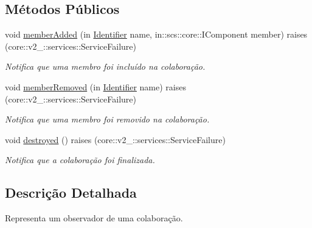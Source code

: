 \subsection*{\-Métodos \-Públicos}
\begin{DoxyCompactItemize}
\item 
void \hyperlink{interfacetecgraf_1_1openbus_1_1services_1_1collaboration_1_1v1__0_1_1CollaborationObserver_a43a313920a1c86e2398bc5bd3c1b1271}{member\-Added} (in \hyperlink{namespacetecgraf_1_1openbus_1_1services_1_1collaboration_1_1v1__0_a75ab61291da492f86a7ea465804c7e45}{\-Identifier} name, in\-::scs\-::core\-::\-I\-Component member)  raises (core\-::v2\-\_\-::services\-::\-Service\-Failure)
\begin{DoxyCompactList}\small\item\em \-Notifica que uma membro foi incluído na colaboração. \end{DoxyCompactList}\item 
void \hyperlink{interfacetecgraf_1_1openbus_1_1services_1_1collaboration_1_1v1__0_1_1CollaborationObserver_afe5fd43d4597bcb051b8ae2416c920e0}{member\-Removed} (in \hyperlink{namespacetecgraf_1_1openbus_1_1services_1_1collaboration_1_1v1__0_a75ab61291da492f86a7ea465804c7e45}{\-Identifier} name)  raises (core\-::v2\-\_\-::services\-::\-Service\-Failure)
\begin{DoxyCompactList}\small\item\em \-Notifica que uma membro foi removido na colaboração. \end{DoxyCompactList}\item 
\hypertarget{interfacetecgraf_1_1openbus_1_1services_1_1collaboration_1_1v1__0_1_1CollaborationObserver_aeab90a28e890c294302c96214baeda8c}{void \hyperlink{interfacetecgraf_1_1openbus_1_1services_1_1collaboration_1_1v1__0_1_1CollaborationObserver_aeab90a28e890c294302c96214baeda8c}{destroyed} ()  raises (core\-::v2\-\_\-::services\-::\-Service\-Failure)}\label{interfacetecgraf_1_1openbus_1_1services_1_1collaboration_1_1v1__0_1_1CollaborationObserver_aeab90a28e890c294302c96214baeda8c}

\begin{DoxyCompactList}\small\item\em \-Notifica que a colaboração foi finalizada. \end{DoxyCompactList}\end{DoxyCompactItemize}


\subsection{\-Descrição \-Detalhada}
\-Representa um observador de uma colaboração. 

